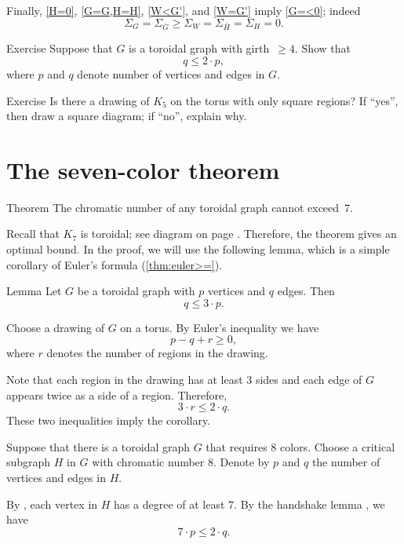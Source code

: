 Finally, \ref{H=0}, \ref{G=G,H=H}, \ref{W<G'}, and \ref{W=G'} imply \ref{G=<0};
indeed
\[\Sigma_G=\Sigma_{\bar G}\ge \Sigma_W=\Sigma_{\bar H}=\Sigma_H=0.\]
\qedsf


\begin{thm}{Exercise}\label{ex:toroidal-girth}
Suppose that $G$ is a toroidal graph with girth~$\ge4$.
Show that 
\[q\le 2\cdot p,\]
where $p$ and $q$ denote number of vertices and edges in $G$.
\end{thm}

\begin{thm}{Exercise}\label{ex:K5-torus}
Is there a drawing of $K_5$ on the torus with only square regions?
If ``yes'', then draw a square diagram; if ``no'', explain why.
\end{thm}

\section{The seven-color theorem}

\begin{thm}{Theorem}\label{thm:7-colors}
The chromatic number of any toroidal graph cannot exceed~$7$.
\end{thm}

Recall that $K_7$ is toroidal; see diagram on page \pageref{K5-toroidal}.
Therefore, the theorem gives an optimal bound.
In the proof, we will use the following lemma, which is a simple corollary of Euler's formula (\ref{thm:euler>=}).

\begin{thm}{Lemma}\label{cor:q=<3p}
Let $G$ be a toroidal graph with $p$ vertices and $q$ edges.
Then 
\[q\le 3\cdot p.\]

\end{thm}

Choose a drawing of $G$ on a torus.
By Euler's inequality we have
\[p-q+r\ge 0,\]
where $r$ denotes the number of regions in the drawing.

Note that each region in the drawing has at least $3$ sides
and each edge of $G$ appears twice as a side of a region.
Therefore, 
\[3\cdot r\le 2\cdot q.\]
These two inequalities imply the corollary.
\qeds


Suppose that there is a toroidal graph $G$ that requires $8$ colors.
Choose a critical subgraph $H$ in $G$ with chromatic number 8.
Denote by $p$ and $q$ the number of vertices and edges in $H$.

By \cite[Theorem 2.1.3]{hartsfield-ringel}, each vertex in $H$ has a degree of at least $7$.
By the handshake lemma \cite[Theorem 1.1.1]{hartsfield-ringel}, we have 
\[7\cdot p\le 2\cdot q.\]

